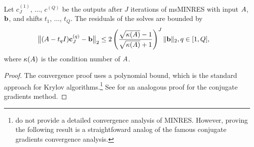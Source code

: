 \begin{lemma}
  Let $c^{(1)}_J$, $\ldots$, $c^{(Q)}$ be the outputs after $J$ iterations of msMINRES with input $A$, $\mathbf{b}$, and shifts $t_1$, $\ldots$, $t_Q$.
  The residuals of the solves are bounded by
  \begin{align*}
    \bigl\Vert (A - t_q I) \mathbf{c}_J^{(q)} - \mathbf{b} \bigr\Vert_2
    &\leq 2 \left( \frac{
      \sqrt{\kappa(A)} - 1
    }{
      \sqrt{\kappa(A)} + 1
    }\right)^J
    \Vert \mathbf{b} \Vert_2,
    q \in [1, Q],
	\end{align*}
  where $\kappa(A)$ is the condition number of $A$.
  \label{lemma:minres}
\end{lemma}
%
\begin{proof}
  The convergence proof uses a polynomial bound, which is the standard approach for Krylov algorithms.\footnote{
    \citet{paige1975solution} do not provide a detailed convergence analysis of MINRES.
    However, proving the following result is a straightfoward analog of the famous conjugate gradients convergence analysis.
  }
  See \citep[e.g.][]{shewchuk1994introduction,trefethen1997numerical,saad2003iterative} for an analogous proof for the conjugate gradients method.


\end{proof}
